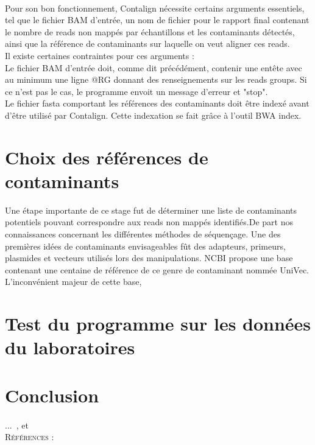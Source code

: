 \documentclass[a4paper,12pt]{article}
\begin{document}
\paragraph{}
Pour son bon fonctionnement, Contalign nécessite certains arguments essentiels, tel que le fichier BAM d'entrée, un nom de fichier pour le rapport final contenant le nombre de reads non mappés par échantillons et les contaminants détectés, ainsi que la référence de contaminants sur laquelle on veut aligner ces reads. \\
Il existe certaines contraintes pour ces arguments : \\
Le fichier BAM d'entrée doit, comme dit précédément, contenir une entête avec au minimum une ligne @RG donnant des renseignements sur les reads groups. Si ce n'est pas le cas, le programme envoit un message d'erreur et "stop". \\
Le fichier fasta comportant les références des contaminants doit être indexé avant d'être utilisé par Contalign. Cette indexation se fait grâce à l'outil BWA index. 
\\
\section{Choix des références de contaminants}
Une étape importante de ce stage fut de déterminer une liste de contaminants potentiels pouvant correspondre aux reads non mappés identifiés.De part nos connaissances concernant les différentes méthodes de séquençage. Une des premières idées de contaminants envisageables fût des adapteurs, primeurs, plasmides et vecteurs utilisés lors des manipulations. NCBI propose une base contenant une centaine de référence de ce genre de contaminant nommée UniVec.  
L'inconvénient majeur de cette base, 
\\
\section{Test du programme sur les données du laboratoires}



\section{Conclusion}
\paragraph{}
 ...~\cite{Johnson}, et ~\cite{Zoran} \\
 

\textsc{\large Références :}\\[1.5cm]

 
 
\end{document}
